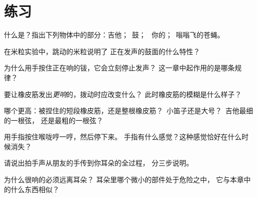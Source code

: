 \section{练习}

\begin{exercise}[$\star$]\label{exo:g3:sound-around-us:1}
什么是？指出下列物体中的部分：吉他；\ 鼓；
\ 你的；\ 嗡嗡飞的苍蝇。
\end{exercise}

\begin{exercise}[$\star$]\label{exo:g3:sound-around-us:2}
在米粒实验中，跳动的米粒说明了
正在发声的鼓面的什么特性？
\end{exercise}

\begin{exercise}[$\star$]\label{exo:g3:sound-around-us:3}
为什么用手按住正在响的钹，它会立刻停止发声？
这一章中起作用的是哪条规律？
\end{exercise}

\begin{exercise}[$\star$]\label{exo:g3:sound-around-us:4}
要让橡皮筋发出\emph{更响}的，拨动时应改变什么？
此时橡皮筋的模糊是什么样子？
\end{exercise}

\begin{exercise}[$\star$]\label{exo:g3:sound-around-us:5}
哪个更高：被捏住的短段橡皮筋，还是整根橡皮筋？\
小笛子还是大号？\ 吉他最细的一根弦，
还是最粗的一根弦？
\end{exercise}

\begin{exercise}[$\star$]\label{exo:g3:sound-around-us:6}
用手指按住喉咙哼一哼，然后停下来。
手指有什么感觉？这种感觉恰好在什么时候消失？
\end{exercise}

\begin{exercise}[$\star$]\label{exo:g3:sound-around-us:7}
请说出拍手声从朋友的手传到你耳朵的全过程，
分三步说明。
\end{exercise}

\begin{exercise}[$\star$]\label{exo:g3:sound-around-us:8}
为什么很响的必须远离耳朵？
耳朵里哪个微小的部件处于危险之中，
它与本章中的什么东西相似？
\end{exercise}

